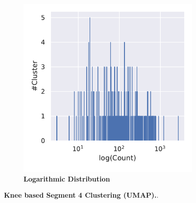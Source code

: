 \begin{figure}
\begin{subfigure}[b]{0.475\textwidth}
    \end{subfigure}
    \hfill
    \begin{subfigure}[b]{0.475\textwidth}
        \caption[Logarithmic Distribution]{\textbf{Logarithmic Distribution}}
        \label{subfig:UMAP_Cluster_Knee_Distribution_log_4}            \includegraphics[width=\textwidth]{UMAP/Cluster_Distribution_Log_Segment_4.pdf}
    \end{subfigure}
    \caption[Knee based Segment 4 Clustering (\Acrshort{UMAP})]{\textbf{Knee based Segment 4 Clustering (\Acrshort{UMAP}).}.}
    \label{fig:UMAP_Cluster_Knee_4}
\end{figure}

